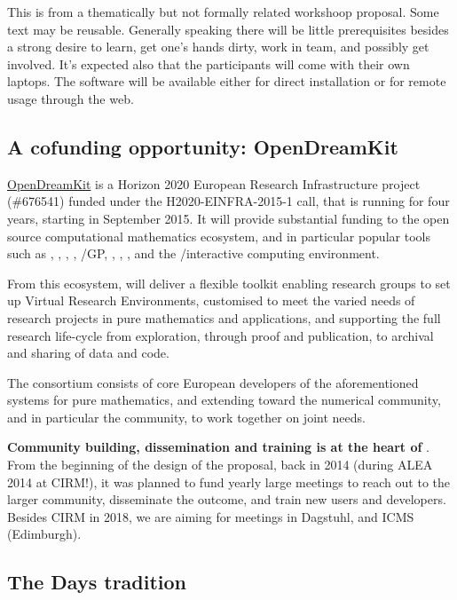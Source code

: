 \begin{oldpart}{This is from a thematically but not formally related workshoop proposal. Some text may be reusable.}
Generally speaking there will be little prerequisites besides a strong
desire to learn, get one's hands dirty, work in team, and possibly get
involved. It's expected also that the participants will come with
their own laptops. The software will be available either for direct
installation or for remote usage through the web.

\subsection{A cofunding opportunity: OpenDreamKit}

\href{http://opendreamkit.org}{OpenDreamKit} is a Horizon 2020
European Research Infrastructure project (\#676541) funded under the
H2020-EINFRA-2015-1 call, that is running for four years, starting in
September 2015. It will provide substantial funding to the open source
computational mathematics ecosystem, and in particular popular tools
such as \Linbox, \MPIR, \Sage, \GAP, \Pari/GP, \LMFDB, \Singular,
\MathHub, and the \IPython/\Jupyter interactive computing environment.

From this ecosystem, \ODK will deliver a flexible toolkit enabling
research groups to set up Virtual Research Environments, customised to
meet the varied needs of research projects in pure mathematics and
applications, and supporting the full research life-cycle from
exploration, through proof and publication, to archival and sharing of
data and code.

The \ODK  consortium consists of core European developers of the
aforementioned systems for pure mathematics, and extending toward the
numerical community, and in particular the \Jupyter  community, to work
together on joint needs.

\textbf{Community building, dissemination and training is at the heart of \ODK}. From the
beginning of the design of the proposal, back in 2014 (during ALEA
2014 at CIRM!), it was planned to fund yearly large meetings to reach
out to the larger community, disseminate the outcome, and train new
users and developers. Besides CIRM in 2018, we are aiming for meetings
in Dagstuhl, and ICMS (Edimburgh).


\subsection{The \Sage Days tradition}


\end{oldpart}

